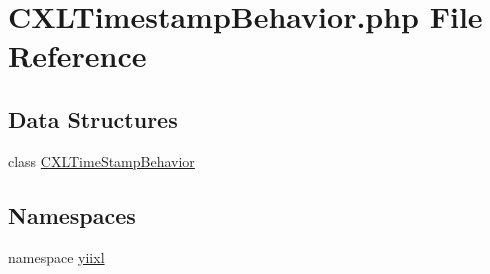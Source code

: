 \hypertarget{CXLTimestampBehavior_8php}{
\section{CXLTimestampBehavior.php File Reference}
\label{CXLTimestampBehavior_8php}
}
\subsection*{Data Structures}
\begin{DoxyCompactItemize}
\item 
class \hyperlink{classCXLTimeStampBehavior}{CXLTimeStampBehavior}
\end{DoxyCompactItemize}
\subsection*{Namespaces}
\begin{DoxyCompactItemize}
\item 
namespace \hyperlink{namespaceyiixl}{yiixl}
\end{DoxyCompactItemize}
